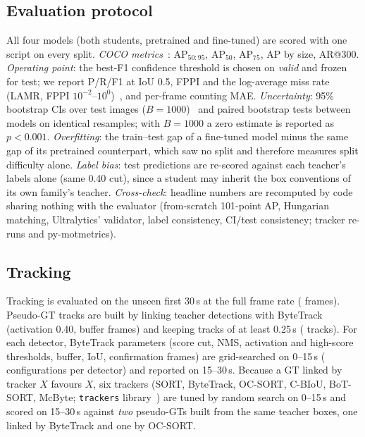 \documentclass[conference]{IEEEtran}
\newcommand{\AP}{AP$_{50:95}$}
\newcommand{\APf}{AP$_{50}$}
\newcommand{\APs}{AP$_{75}$}
\begin{document}
\subsection{Evaluation protocol}
All four models (both students, pretrained and fine-tuned) are scored with one script on every split.
\emph{COCO metrics}~\cite{lin2014coco}: \AP{}, \APf{}, \APs{}, AP by size, AR@300. \emph{Operating point}: the
best-F1 confidence threshold is chosen on \emph{valid} and frozen for test; we report P/R/F1 at IoU 0.5, FPPI
and the log-average miss rate (LAMR, FPPI $10^{-2}$--$10^{0}$)~\cite{dollar2012pedestrian}, and per-frame
counting MAE. \emph{Uncertainty}: 95\% bootstrap CIs over test images ($B{=}1000$)~\cite{efron1993bootstrap}
and paired bootstrap tests between models on identical resamples; with $B{=}1000$ a zero estimate is reported
as $p<0.001$. \emph{Overfitting}: the train--test gap of a fine-tuned model minus the same gap of its pretrained
counterpart, which saw no split and therefore measures split difficulty alone. \emph{Label bias}: test
predictions are re-scored against each teacher's labels alone (same 0.40 cut), since a student may inherit the
box conventions of its own family's teacher. \emph{Cross-check}: headline numbers are recomputed by code sharing
nothing with the evaluator (from-scratch 101-point AP, Hungarian matching, Ultralytics' validator, label
consistency, CI/test consistency; tracker re-runs and py-motmetrics).

\subsection{Tracking}
Tracking is evaluated on the unseen first 30\,s at the full frame rate (\GtFrames{} frames). Pseudo-GT tracks are
built by linking teacher detections with ByteTrack (activation 0.40, buffer \GtBuffer{} frames) and keeping
tracks of at least 0.25\,s (\GtTracks{} tracks). For each detector, ByteTrack parameters (score cut, NMS,
activation and high-score thresholds, buffer, IoU, confirmation frames) are grid-searched on 0--15\,s
(\GridSize{} configurations per detector) and reported on 15--30\,s. Because a GT linked by tracker $X$ favours
$X$, six trackers (SORT, ByteTrack, OC-SORT, C-BIoU, BoT-SORT, McByte; \texttt{trackers}
library~\cite{trackerslib}) are tuned by random search on 0--15\,s and scored on 15--30\,s against \emph{two}
pseudo-GTs built from the same teacher boxes, one linked by ByteTrack and one by OC-SORT.
\end{document}
